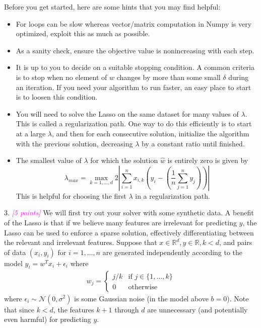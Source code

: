 \documentclass{article}
\newcommand{\1}{\mathbf{1}}
\newcommand{\grade}[1]{\small\textcolor{magenta}{\emph{[#1 points]}} \normalsize}
\begin{document}
Before you get started, here are some hints that you may find helpful:
\begin{itemize}
  \item For loops can be slow whereas vector/matrix computation in Numpy is very optimized, exploit this as much as possible.
  \item As a sanity check, ensure the objective value is nonincreasing with each step. 
  \item It is up to you to decide on a suitable stopping condition.  A common criteria is to stop when no element of
      ${w}$ changes by more than some small $\delta$ during an iteration.  If you need your algorithm to run faster,
      an easy place to start is to loosen this condition.
  \item You will need to solve the Lasso on the same dataset for many values of $\lambda$.  This
      is called a regularization path.  One way to do this efficiently is to start at a large $\lambda$, and then for
      each consecutive solution, initialize the algorithm with the previous solution, decreasing $\lambda$ by a constant
      ratio until finished.
  \item The smallest value of $\lambda$ for which the solution $\widehat{w}$ is entirely zero is given by
      \[ \lambda_{max} = \max_{k=1,\dots,d} 2 \left|\sum_{i=1}^n {x}_{i,k} \left({y}_i - \left(\frac{1}{n} \sum_{j=1}^n y_j \right)\right)\right| \]
      This is helpful for choosing the first $\lambda$ in a regularization path. 
\end{itemize}

3. \grade{5}  We will first try out your solver with some synthetic data.
A benefit of the Lasso is that if we believe many features are irrelevant for predicting ${y}$, the Lasso can be used to enforce a sparse solution, effectively differentiating between the relevant and irrelevant features.
Suppose that ${x} \in \mathbb{R}^d, y \in \mathbb{R}, k < d$, and pairs of data $({x}_i, y_i)$ for $i=1,\dots,n$ are generated independently according to the model $y_i = w^T x_i + \epsilon_i$ where
\begin{align*}
w_j = \begin{cases} j/k & \text{if } j \in \{1,\dots,k\} \\
0 & \text{otherwise}
\end{cases}
\end{align*} 
where $\epsilon_i \sim \mathcal{N}(0, \sigma^2)$ is some Gaussian noise (in the model above $b=0$).  Note that since $k < d$, the features $k + 1$ through $d$ are unnecessary (and potentially even harmful) for predicting $y$.
\end{document}
